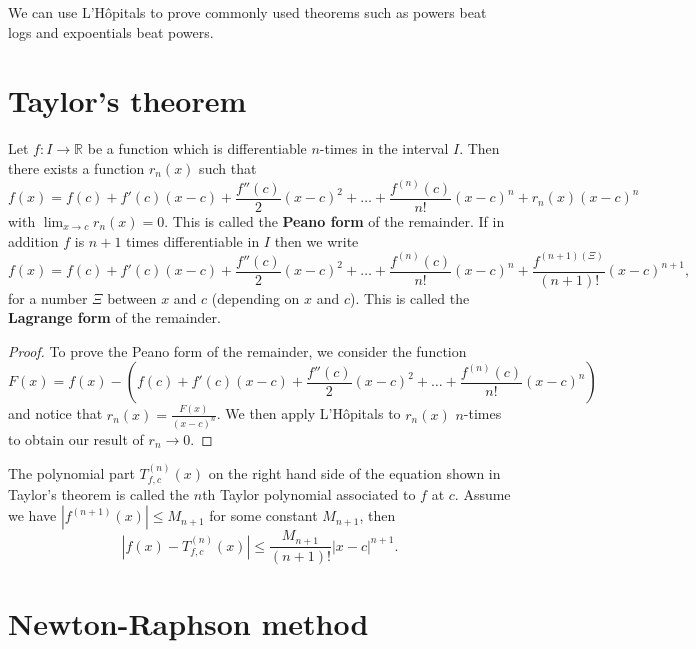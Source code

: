 \begin{remark}
    We can use L'H\^opitals to prove commonly used theorems such as powers beat logs and expoentials beat powers.
\end{remark}

\section{Taylor's theorem}

\begin{definition}
    Let $f : I \to \mathbb R$ be a function which is differentiable $n$-times in the interval $I$. Then there exists a function $r_n(x)$ such that \[ f(x) = f(c) + f'(c) (x - c) + \frac{f''(c)}{2} (x - c)^2 + \ldots + \frac{f^{(n)}(c)}{n!} (x - c)^n + r_n(x)(x - c)^n \] with $\lim_{x \to c} r_n(x) = 0$. This is called the \textbf{Peano form} of the remainder. If in addition $f$ is $n + 1$ times differentiable in $I$ then we write \[f(x) = f(c) + f'(c) (x - c) + \frac{f''(c)}{2} (x - c)^2 + \ldots + \frac{f^{(n)}(c)}{n!} (x - c)^n + \frac{f^{(n + 1)(\Xi)}}{(n + 1)!} (x - c)^{n + 1},\] for a number $\Xi$ between $x$ and $c$ (depending on $x$ and $c$). This is called the \textbf{Lagrange form} of the remainder.
\end{definition}

\begin{proof}
    To prove the Peano form of the remainder, we consider the function \[F(x) = f(x) - \left(f(c) + f'(c) (x - c) + \frac{f''(c)}{2} (x - c)^2 + \ldots + \frac{f^{(n)}(c)}{n!} (x - c)^n\right)\] and notice that $r_n(x) = \frac{F(x)}{(x - c)^n}$. We then apply L'H\^opitals to $r_n(x)$ $n$-times to obtain our result of $r_n \to 0$.
\end{proof}

\begin{corollary}
    The polynomial part $T_{f, c}^{(n)}(x)$ on the right hand side of the equation shown in Taylor's theorem is called the $n$th Taylor polynomial associated to $f$ at $c$. Assume we have $\left\lvert f^{(n + 1)}(x) \right\rvert \leq M_{n + 1}$ for some constant $M_{n + 1}$, then \[\left\lvert f(x) - T_{f, c}^{(n)}(x) \right\rvert \leq \frac{M_{n + 1}}{(n + 1)!} \left\lvert x - c \right\rvert^{n + 1}.\]
\end{corollary}

\section{Newton-Raphson method}

